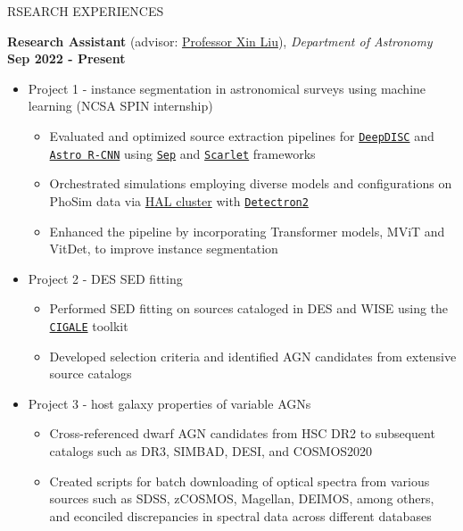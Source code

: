 \documentclass[10pt]{article} %
\begin{document}
\begin{section}{RSEARCH EXPERIENCES}

\textbf{Research Assistant} (advisor: \href{mailto:xinliuxl@illinois.edu}{Professor Xin Liu}), \textit{Department of Astronomy} \hfill \textbf{Sep 2022 - Present} 
\begin{itemize}[leftmargin=1.5em]
    \item Project 1 - instance segmentation in astronomical surveys using machine learning (NCSA SPIN internship) %
    \begin{itemize}[leftmargin=1.5em]
        \item Evaluated and optimized source extraction pipelines for \href{https://github.com/burke86/deepdisc}{\texttt{DeepDISC}} and \href{https://github.com/burke86/astro_rcnn}{\texttt{Astro R-CNN}} using \href{https://github.com/kbarbary/sep/tree/v1.1.x}{\texttt{Sep}} and \href{https://github.com/pmelchior/scarlet}{\texttt{Scarlet}} frameworks
        \item Orchestrated simulations employing diverse models and configurations on PhoSim data via \href{https://www.ncsa.illinois.edu/research/project-highlights/hal-cluster/}{HAL cluster} with \href{https://github.com/facebookresearch/detectron2}{\texttt{Detectron2}}
        \item Enhanced the pipeline by incorporating Transformer models, MViT and VitDet, to improve instance segmentation
    \end{itemize}
    \item Project 2 - DES SED fitting %
    \begin{itemize}[leftmargin=1.5em]
        \item Performed SED fitting on sources cataloged in DES and WISE using the \href{https://cigale.lam.fr/}{\texttt{CIGALE}} toolkit
        \item Developed selection criteria and identified AGN candidates from extensive source catalogs
    \end{itemize}
    \item Project 3 - host galaxy properties of variable AGNs %
    \begin{itemize}[leftmargin=1.5em]
        \item Cross-referenced dwarf AGN candidates from HSC DR2 to subsequent catalogs such as DR3, SIMBAD, DESI, and COSMOS2020
        \item Created scripts for batch downloading of optical spectra from various sources such as SDSS, zCOSMOS, Magellan, DEIMOS, among others, and econciled discrepancies in spectral data across different databases

\end{itemize}
\end{itemize}
\end{section}
\end{document}
